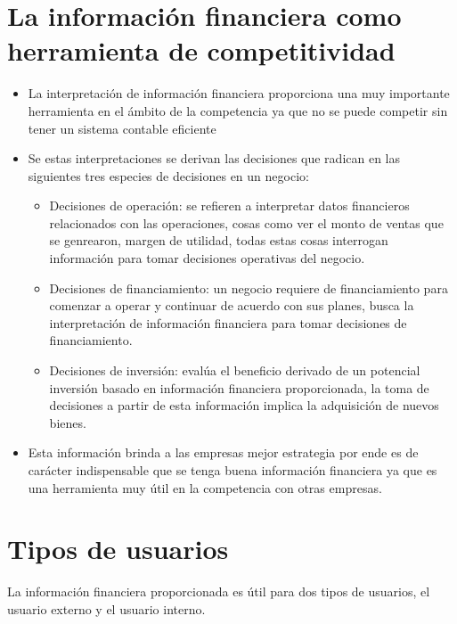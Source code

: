 \documentclass{article}
\begin{document}
\section{La información financiera como herramienta de competitividad}
\begin{itemize}
    \item La interpretación de información financiera proporciona una muy importante herramienta en el ámbito de la competencia ya que no se puede competir sin tener un sistema contable eficiente
    \item Se estas interpretaciones se derivan las decisiones que radican en las siguientes tres especies de decisiones en un negocio:
    \begin{itemize}
        \item Decisiones de operación: se refieren a interpretar datos financieros relacionados con las operaciones, cosas como ver el monto de ventas que se genrearon, margen de utilidad, todas estas cosas interrogan información para tomar decisiones operativas del negocio.
        \item Decisiones de financiamiento: un negocio requiere de financiamiento para comenzar a operar y continuar de acuerdo con sus planes, busca la interpretación de información financiera para tomar decisiones de financiamiento.
        \item Decisiones de inversión: evalúa el beneficio derivado de un potencial inversión basado en información financiera proporcionada, la toma de decisiones a partir de esta información implica la adquisición de nuevos bienes.
    \end{itemize}
    
    \item Esta información brinda a las empresas mejor estrategia por ende es de carácter indispensable que se tenga buena información financiera ya que es una herramienta muy útil en la competencia con otras empresas.
\end{itemize}


\section{Tipos de usuarios}
La información financiera proporcionada es útil para dos tipos de usuarios, el usuario externo y el usuario interno.
\end{document}
